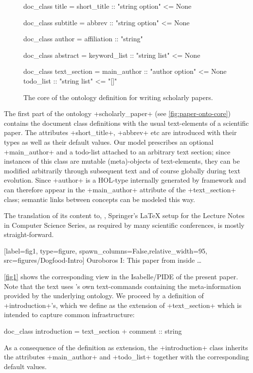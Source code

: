 \begin{isabellebody}
\begin{isamarkuptext}
\begin{figure}
\begin{isar}
doc_class title =
   short_title :: "string option"  <=  None
     
doc_class subtitle =
   abbrev :: "string option"       <=  None

doc_class author =
   affiliation :: "string"

doc_class abstract =
   keyword_list :: "string list"  <= None

doc_class text_section = 
   main_author :: "author option"  <=  None
   todo_list   :: "string list"    <=  "[]"
\end{isar}
\caption{The core of the ontology definition for writing scholarly papers.}
\label{fig:paper-onto-core}
\end{figure}
The first part of the ontology \inlineisar+scholarly_paper+ (see \autoref{fig:paper-onto-core})
contains the document class definitions
with the usual text-elements of a scientific paper. The attributes \inlineisar+short_title+, 
\inlineisar+abbrev+ etc are introduced with their types as well as their default values.
Our model prescribes an optional \inlineisar+main_author+ and a todo-list attached to an arbitrary 
text section; since instances of this class are mutable (meta)-objects of text-elements, they
can be modified arbitrarily through subsequent text and of course globally during text evolution.
Since \inlineisar+author+ is a HOL-type internally generated by \isadof framework and can therefore
appear in the \inlineisar+main_author+ attribute of the \inlineisar+text_section+ class; 
semantic links between concepts can be modeled this way.

The translation of its content to, \eg, Springer's \LaTeX{} setup for the Lecture Notes in Computer 
Science Series, as required by many scientific conferences, is mostly straight-forward.%
\end{isamarkuptext}\isamarkuptrue%
%
\isaDofFigure%
%
[label={fig1}, type={figure}, spawn_columns=False,relative_width={95}, 
        src={figures/Dogfood-Intro}]%
{Ouroboros I: This paper from inside \ldots}%
%
\begin{isamarkuptext}%
\autoref{fig1} shows the corresponding view in the Isabelle/PIDE of the present paper.
Note that the text uses \isadof's own text-commands containing the meta-information provided by
the underlying ontology.
We proceed by a definition of \inlineisar+introduction+'s, which we define as the extension of
\inlineisar+text_section+ which is intended to capture common infrastructure:
\begin{isar}
doc_class introduction = text_section +
   comment :: string
\end{isar}
As a consequence of the definition as extension, the \inlineisar+introduction+ class
inherits the attributes \inlineisar+main_author+ and \inlineisar+todo_list+ together with 
the corresponding default values.


\end{isamarkuptext}
\end{isabellebody}
